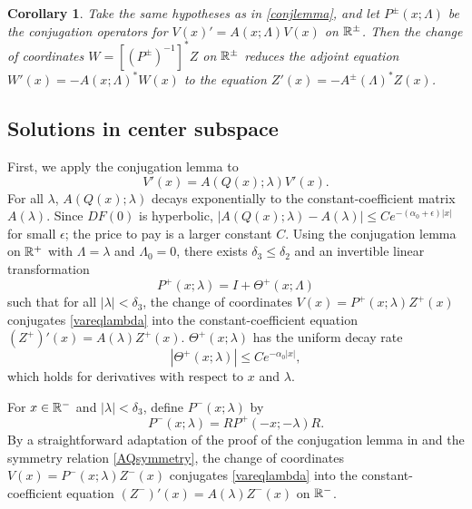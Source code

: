 \documentclass[12pt]{elsarticle}
\theoremstyle{plain}
\newtheorem{corollary}[theorem]{Corollary}
\theoremstyle{definition}
\theoremstyle{remark}
\numberwithin{theorem}{section}
\numberwithin{equation}{section}
\begin{document}
\begin{corollary}\label{corr:adjconj}
Take the same hypotheses as in \cref{conjlemma}, and let $P^\pm(x; \Lambda)$ be the conjugation operators for $V(x)' = A(x; \Lambda) V(x)$ on $\mathbb{R}^\pm$. Then the change of coordinates $W = [(P^\pm)^{-1}]^* Z$ on $\mathbb{R}^\pm$ reduces the adjoint equation $W'(x) = -A(x; \Lambda)^* W(x)$ to the equation $Z'(x) = -A^\pm(\Lambda)^* Z(x)$.
\end{corollary}

\subsection{Solutions in center subspace}\label{sec:conjvareq}

First, we apply the conjugation lemma to
\begin{equation}\label{vareqlambda}
V'(x) = A(Q(x); \lambda) V'(x).
\end{equation}
For all $\lambda$, $A(Q(x); \lambda)$ decays exponentially to the constant-coefficient matrix $A(\lambda)$. Since $DF(0)$ is hyperbolic, $|A(Q(x); \lambda) - A(\lambda)| \leq C e^{-(\alpha_0 + \epsilon) |x|}$ for small $\epsilon$; the price to pay is a larger constant $C$. Using the conjugation lemma on $\mathbb{R}^+$ with $\Lambda = \lambda$ and $\Lambda_0 = 0$, there exists $\delta_3 \leq \delta_2$ and an invertible linear transformation 
\begin{equation}\label{defPplus}
P^+(x; \lambda) = I + \Theta^+(x; \Lambda)
\end{equation}
such that for all $|\lambda| < \delta_3$, the change of coordinates $V(x) = P^+(x; \lambda) Z^+(x)$ conjugates \cref{vareqlambda} into the constant-coefficient equation $(Z^+)'(x) = A(\lambda) Z^+(x)$. $\Theta^+(x; \lambda)$ has the uniform decay rate
\begin{equation}\label{Thetadecay}
|\Theta^+(x; \lambda)| \leq C e^{-\alpha_0 |x|},
\end{equation}
which holds for derivatives with respect to $x$ and $\lambda$. 

For $x \in \mathbb{R}^-$ and $|\lambda| < \delta_3$, define $P^-(x; \lambda)$ by
\begin{equation}\label{defPminus}
P^-(x; \lambda) = RP^+(-x; -\lambda)R.
\end{equation}
By a straightforward adaptation of the proof of the conjugation lemma in \cite{Zumbrun2009} and the symmetry relation \cref{AQsymmetry}, the change of coordinates $V(x) = P^-(x; \lambda) Z^-(x)$ conjugates \cref{vareqlambda} into the constant-coefficient equation $(Z^-)'(x) = A(\lambda) Z^-(x)$ on $\mathbb{R}^-$.
\end{document}
